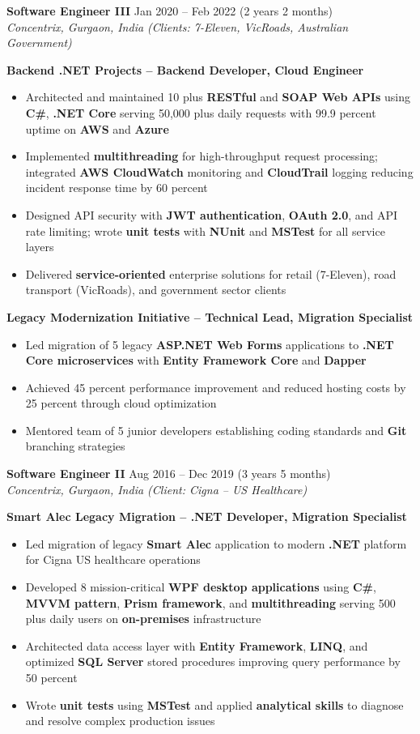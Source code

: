 \documentclass[10pt,a4paper]{article}
\newcommand{\jobentry}[3]{%
    \vspace{4pt}
    {\normalsize\bfseries #1} \hfill #2\\
    \textit{#3}
}
\begin{document}
\jobentry{Software Engineer III}{Jan 2020 -- Feb 2022 (2 years 2 months)}{Concentrix, Gurgaon, India (Clients: 7-Eleven, VicRoads, Australian Government)}

\textbf{Backend .NET Projects -- Backend Developer, Cloud Engineer}
\begin{itemize}
    \item Architected and maintained 10 plus \textbf{RESTful} and \textbf{SOAP Web APIs} using \textbf{C\#}, \textbf{.NET Core} serving 50,000 plus daily requests with 99.9 percent uptime on \textbf{AWS} and \textbf{Azure}
    \item Implemented \textbf{multithreading} for high-throughput request processing; integrated \textbf{AWS CloudWatch} monitoring and \textbf{CloudTrail} logging reducing incident response time by 60 percent
    \item Designed API security with \textbf{JWT authentication}, \textbf{OAuth 2.0}, and API rate limiting; wrote \textbf{unit tests} with \textbf{NUnit} and \textbf{MSTest} for all service layers
    \item Delivered \textbf{service-oriented} enterprise solutions for retail (7-Eleven), road transport (VicRoads), and government sector clients
\end{itemize}

\textbf{Legacy Modernization Initiative -- Technical Lead, Migration Specialist}
\begin{itemize}
    \item Led migration of 5 legacy \textbf{ASP.NET Web Forms} applications to \textbf{.NET Core microservices} with \textbf{Entity Framework Core} and \textbf{Dapper}
    \item Achieved 45 percent performance improvement and reduced hosting costs by 25 percent through cloud optimization
    \item Mentored team of 5 junior developers establishing coding standards and \textbf{Git} branching strategies
\end{itemize}

\jobentry{Software Engineer II}{Aug 2016 -- Dec 2019 (3 years 5 months)}{Concentrix, Gurgaon, India (Client: Cigna -- US Healthcare)}

\textbf{Smart Alec Legacy Migration -- .NET Developer, Migration Specialist}
\begin{itemize}
    \item Led migration of legacy \textbf{Smart Alec} application to modern \textbf{.NET} platform for Cigna US healthcare operations
    \item Developed 8 mission-critical \textbf{WPF desktop applications} using \textbf{C\#}, \textbf{MVVM pattern}, \textbf{Prism framework}, and \textbf{multithreading} serving 500 plus daily users on \textbf{on-premises} infrastructure
    \item Architected data access layer with \textbf{Entity Framework}, \textbf{LINQ}, and optimized \textbf{SQL Server} stored procedures improving query performance by 50 percent
    \item Wrote \textbf{unit tests} using \textbf{MSTest} and applied \textbf{analytical skills} to diagnose and resolve complex production issues
\end{itemize}
\end{document}
